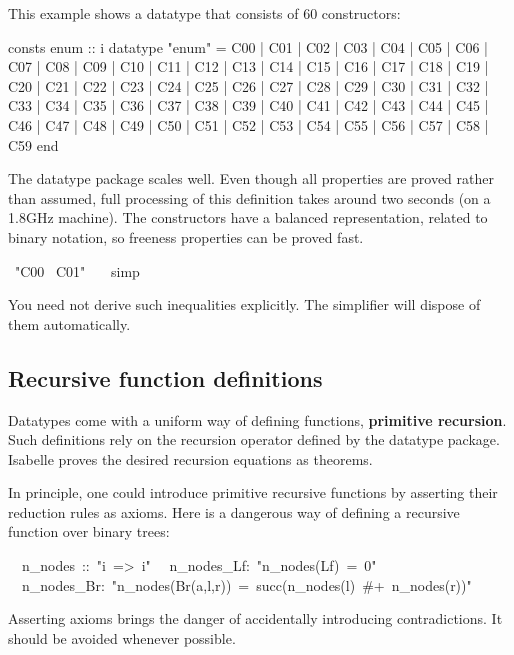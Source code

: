This example shows a datatype that consists of 60 constructors:
\begin{ttbox}\isastyleminor
consts  enum :: i
datatype
  "enum" = C00 | C01 | C02 | C03 | C04 | C05 | C06 | C07 | C08 | C09
         | C10 | C11 | C12 | C13 | C14 | C15 | C16 | C17 | C18 | C19
         | C20 | C21 | C22 | C23 | C24 | C25 | C26 | C27 | C28 | C29
         | C30 | C31 | C32 | C33 | C34 | C35 | C36 | C37 | C38 | C39
         | C40 | C41 | C42 | C43 | C44 | C45 | C46 | C47 | C48 | C49
         | C50 | C51 | C52 | C53 | C54 | C55 | C56 | C57 | C58 | C59
end
\end{ttbox}
The datatype package scales well.  Even though all properties are proved
rather than assumed, full processing of this definition takes around two seconds
(on a 1.8GHz machine).  The constructors have a balanced representation,
related to binary notation, so freeness properties can be proved fast.
\begin{isabelle}
\ "C00 \isasymnoteq\ C01"\isanewline
\ \ \ simp
\end{isabelle}
You need not derive such inequalities explicitly.  The simplifier will
dispose of them automatically.



\subsection{Recursive function definitions}\label{sec:ZF:recursive}

Datatypes come with a uniform way of defining functions, {\bf primitive
  recursion}.  Such definitions rely on the recursion operator defined by the
datatype package.  Isabelle proves the desired recursion equations as
theorems.

In principle, one could introduce primitive recursive functions by asserting
their reduction rules as axioms.  Here is a dangerous way of defining a
recursive function over binary trees:
\begin{isabelle}
\ \ n\_nodes\ ::\ "i\ =>\ i"\isanewline
{}\isanewline
\ \ n\_nodes\_Lf:\ "n\_nodes(Lf)\ =\ 0"\isanewline
\ \ n\_nodes\_Br:\ "n\_nodes(Br(a,l,r))\ =\ succ(n\_nodes(l)\ \#+\ n\_nodes(r))"
\end{isabelle}
Asserting axioms brings the danger of accidentally introducing
contradictions.  It should be avoided whenever possible.

